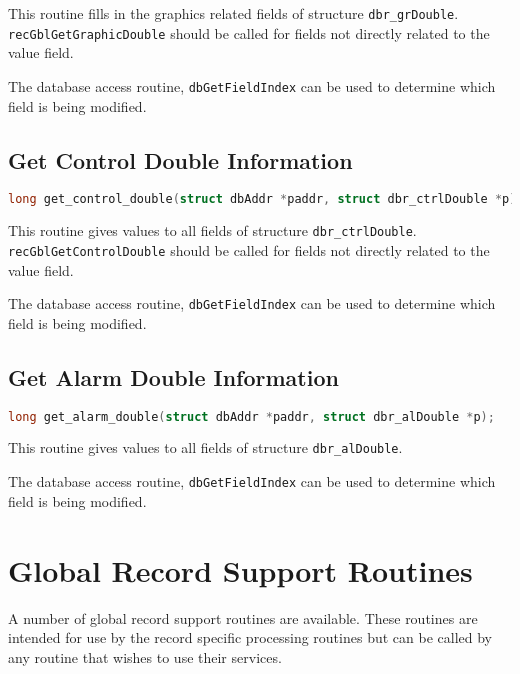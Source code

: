 This routine fills in the graphics related fields of structure \verb|dbr_grDouble|.
\verb|recGblGetGraphicDouble| should be called for fields not directly related to the value field.

The database access routine, \verb|dbGetFieldIndex| can be used to determine which field is being modified.

\subsection{Get Control Double Information}

\begin{lstlisting}[language=C]
long get_control_double(struct dbAddr *paddr, struct dbr_ctrlDouble *p);
\end{lstlisting}

This routine gives values to all fields of structure \verb|dbr_ctrlDouble|.
\verb|recGblGetControlDouble| should be called for fields not directly related to the value field.

The database access routine, \verb|dbGetFieldIndex| can be used to determine which field is being modified.

\subsection{Get Alarm Double Information}

\begin{lstlisting}[language=C]
long get_alarm_double(struct dbAddr *paddr, struct dbr_alDouble *p);
\end{lstlisting}

This routine gives values to all fields of structure \verb|dbr_alDouble|.

The database access routine, \verb|dbGetFieldIndex| can be used to determine which field is being modified.

\section{Global Record Support Routines}

A number of global record support routines are available.
These routines are intended for use by the record specific processing routines but can be called by any routine that wishes to use their services.

